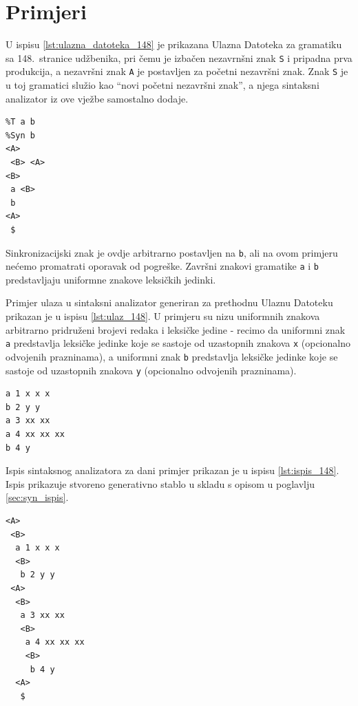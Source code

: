 \documentclass[times, 12pt, utf8]{book}
\begin{document}
\section{Primjeri}
U ispisu \ref{lst:ulazna_datoteka_148} je prikazana Ulazna Datoteka za gramatiku sa 148.~stranice udžbenika, pri čemu je izbačen nezavrnšni znak \texttt{S} i pripadna prva produkcija, a nezavršni znak \texttt{A} je postavljen za početni nezavršni znak.
Znak \texttt{S} je u toj gramatici služio kao ``novi početni nezavršni znak'', a njega sintaksni analizator iz ove vježbe samostalno dodaje.

\begin{lstlisting}[caption={Ulazna Datoteka za gramatiku sa 148.~stranice udžbenika.},label=lst:ulazna_datoteka_148]
%V <A> <B>
%T a b
%Syn b
<A>
 <B> <A>
<B>
 a <B>
 b
<A>
 $

\end{lstlisting}

Sinkronizacijski znak je ovdje arbitrarno postavljen na \verb|b|, ali na ovom primjeru nećemo promatrati oporavak od pogreške.
Završni znakovi gramatike \verb|a| i \verb|b| predstavljaju uniformne znakove leksičkih jedinki.

Primjer ulaza u sintaksni analizator generiran za prethodnu Ulaznu Datoteku prikazan je u ispisu \ref{lst:ulaz_148}.
U primjeru su nizu uniformnih znakova arbitrarno pridruženi brojevi redaka i leksičke jedine - recimo da uniformni znak \verb|a| predstavlja leksičke jedinke koje se sastoje od uzastopnih znakova \verb|x| (opcionalno odvojenih prazninama), a uniformni znak \verb|b| predstavlja leksičke jedinke koje se sastoje od uzastopnih znakova \verb|y| (opcionalno odvojenih prazninama).

\begin{lstlisting}[caption={Ulaz u analizator za gramatiku sa 148.~stranice udžbenika.},label=lst:ulaz_148]
a 1 x x x
b 2 y y
a 3 xx xx
a 4 xx xx xx
b 4 y

\end{lstlisting}

Ispis sintaksnog analizatora za dani primjer prikazan je u ispisu \ref{lst:ispis_148}.
Ispis prikazuje stvoreno generativno stablo u skladu s opisom u poglavlju \ref{sec:syn_ispis}.

\begin{lstlisting}[caption={Ispis analizatora za gramatiku sa 148.~stranice udžbenika i ulaz is ispisa \ref{lst:ulaz_148}.},label=lst:ispis_148]
<A>
 <B>
  a 1 x x x
  <B>
   b 2 y y
 <A>
  <B>
   a 3 xx xx
   <B>
    a 4 xx xx xx
    <B>
     b 4 y
  <A>
   $

\end{lstlisting}
\end{document}
